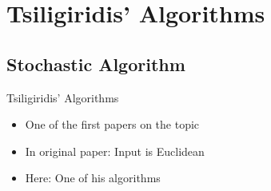 \section{Tsiligiridis' Algorithms}

\subsection{Stochastic Algorithm}

\begin{frame}{Tsiligiridis' Algorithms}


	\begin{itemize}
		\item<1-> One of the first papers on the topic \cite{tsiligiridis_heuristic_1984}
		\item<2-> In original paper: Input is Euclidean
		\item<2-> Here: One of his algorithms
	\end{itemize}
\end{frame}

